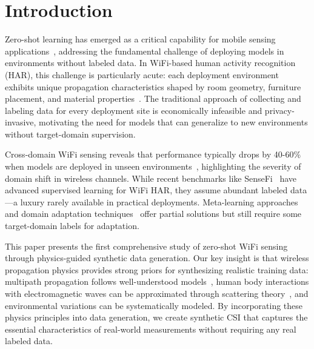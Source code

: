 \documentclass[journal]{IEEEtran}
\begin{document}
\section{Introduction}

Zero-shot learning has emerged as a critical capability for mobile sensing applications~\cite{zhao2023zero}, addressing the fundamental challenge of deploying models in environments without labeled data. In WiFi-based human activity recognition (HAR), this challenge is particularly acute: each deployment environment exhibits unique propagation characteristics shaped by room geometry, furniture placement, and material properties~\cite{li2024cross}. The traditional approach of collecting and labeling data for every deployment site is economically infeasible and privacy-invasive, motivating the need for models that can generalize to new environments without target-domain supervision.

Cross-domain WiFi sensing reveals that performance typically drops by 40-60\% when models are deployed in unseen environments~\cite{domain2023shift}, highlighting the severity of domain shift in wireless channels. While recent benchmarks like SenseFi~\cite{yang2023sensefi} have advanced supervised learning for WiFi HAR, they assume abundant labeled data—a luxury rarely available in practical deployments. Meta-learning approaches~\cite{maml2017} and domain adaptation techniques~\cite{dann2016} offer partial solutions but still require some target-domain labels for adaptation.

This paper presents the first comprehensive study of zero-shot WiFi sensing through physics-guided synthetic data generation. Our key insight is that wireless propagation physics provides strong priors for synthesizing realistic training data: multipath propagation follows well-understood models~\cite{saleh1987statistical}, human body interactions with electromagnetic waves can be approximated through scattering theory~\cite{goldsmith2005wireless}, and environmental variations can be systematically modeled. By incorporating these physics principles into data generation, we create synthetic CSI that captures the essential characteristics of real-world measurements without requiring any real labeled data.
\end{document}
